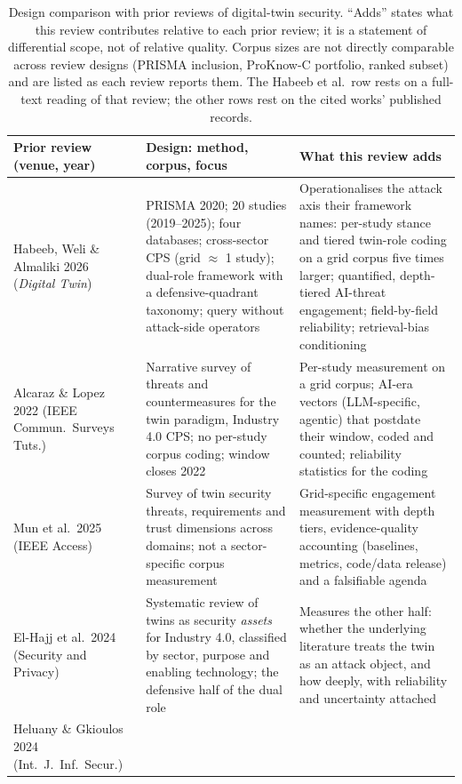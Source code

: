 \documentclass[preprint,12pt]{elsarticle}
\renewcommand{\_}{\plainunderscore\allowbreak}
\begin{document}
\begin{table}[tp]
\centering
\caption{Design comparison with prior reviews of digital-twin security. ``Adds'' states
what this review contributes relative to each prior review; it is a statement of
differential scope, not of relative quality. Corpus sizes are not directly comparable
across review designs (PRISMA inclusion, ProKnow-C portfolio, ranked subset) and are
listed as each review reports them. The Habeeb et al.\ row rests on a full-text
reading of that review; the other rows rest on the cited works' published records.}
\label{tab:priorreviews}
\footnotesize
\begin{tabular}{@{}p{2.9cm}p{5.3cm}p{6.3cm}@{}}
\toprule
Prior review (venue, year) & Design: method, corpus, focus & What this review adds \\
\midrule
Habeeb, Weli \& Almaliki 2026 (\emph{Digital Twin}) &
PRISMA 2020; 20 studies (2019--2025); four databases; cross-sector CPS
(grid $\approx$ 1 study); dual-role framework with a defensive-quadrant taxonomy;
query without attack-side operators &
Operationalises the attack axis their framework names: per-study stance and tiered
twin-role coding on a grid corpus five times larger; quantified, depth-tiered
AI-threat engagement; field-by-field reliability; retrieval-bias conditioning \\
\addlinespace
Alcaraz \& Lopez 2022 (IEEE Commun.\ Surveys Tuts.) &
Narrative survey of threats and countermeasures for the twin paradigm, Industry 4.0
CPS; no per-study corpus coding; window closes 2022 &
Per-study measurement on a grid corpus; AI-era vectors (LLM-specific, agentic) that
postdate their window, coded and counted; reliability statistics for the coding \\
\addlinespace
Mun et al.\ 2025 (IEEE Access) &
Survey of twin security threats, requirements and trust dimensions across domains;
not a sector-specific corpus measurement &
Grid-specific engagement measurement with depth tiers, evidence-quality accounting
(baselines, metrics, code/data release) and a falsifiable agenda \\
\addlinespace
El-Hajj et al.\ 2024 (Security and Privacy) &
Systematic review of twins as security \emph{assets} for Industry 4.0, classified by
sector, purpose and enabling technology; the defensive half of the dual role &
Measures the other half: whether the underlying literature treats the twin as an
attack object, and how deeply, with reliability and uncertainty attached \\
\addlinespace
Heluany \& Gkioulos 2024 (Int.\ J.\ Inf.\ Secur.) &

\end{tabular}
\end{table}
\end{document}
